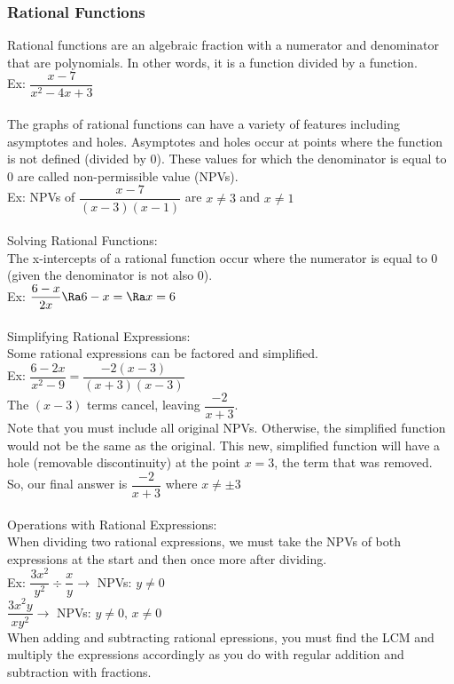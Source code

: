 \subsubsection{Rational Functions}
Rational functions are an algebraic fraction with a numerator and denominator that are polynomials. In other words, it is a function divided by a function.\\
Ex: $\dfrac{x-7}{x^2-4x+3}$\\
\\
The graphs of rational functions can have a variety of features including asymptotes and holes. Asymptotes and holes occur at points where the function is not defined (divided by 0). These values for which the denominator is equal to 0 are called non-permissible value (NPVs).\\
Ex: NPVs of $\dfrac{x-7}{(x-3)(x-1)}$ are $x\neq3$ and $x\neq 1$\\
\\
Solving Rational Functions:\\
The x-intercepts of a rational function occur where the numerator is equal to 0 (given the denominator is not also 0).\\
Ex: $\dfrac{6-x}{2x}\Ra6-x=\Ra x=6$\\
\\
Simplifying Rational Expressions:\\
Some rational expressions can be factored and simplified.\\
Ex: $\dfrac{6-2x}{x^2-9}=\dfrac{-2(x-3)}{(x+3)(x-3)}$\\
The $(x-3)$ terms cancel, leaving $\dfrac{-2}{x+3}$.\\
Note that you must include all original NPVs. Otherwise, the simplified function would not be the same as the original. This new, simplified function will have a hole (removable discontinuity) at the point $x=3$, the term that was removed.\\
So, our final answer is $\dfrac{-2}{x+3}$ where $x\neq\pm3$\\
\\
Operations with Rational Expressions:\\
When dividing two rational expressions, we must take the NPVs of both expressions at the start and then once more after dividing.\\
Ex: $\dfrac{3x^2}{y^2}\div\dfrac{x}{y}\to$ NPVs: $y\neq0$\\
$\dfrac{3x^2y}{xy^2}\to$ NPVs: $y\neq0,\,x\neq0$\\
When adding and subtracting rational epressions, you must find the LCM and multiply the expressions accordingly as you do with regular addition and subtraction with fractions.\\
